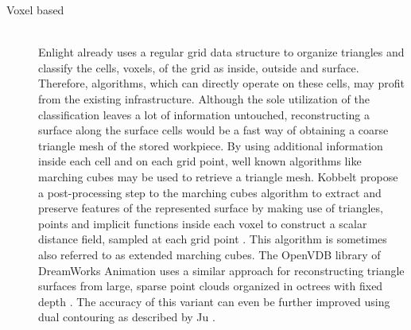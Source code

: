 \begin{description}
	\item[Voxel based] \hfill \\
	Enlight already uses a regular grid data structure to organize triangles and classify the cells, \ie voxels, of the grid as inside, outside and surface.
	Therefore, algorithms, which can directly operate on these cells, may profit from the existing infrastructure.
	Although the sole utilization of the classification leaves a lot of information untouched, reconstructing a surface along the surface cells would be a fast way of obtaining a coarse triangle mesh of the stored workpiece.
	By using additional information inside each cell and on each grid point, well known algorithms like marching cubes may be used to retrieve a triangle mesh.
	Kobbelt \etal propose a post-processing step to the marching cubes algorithm to extract and preserve features of the represented surface by making use of triangles, points and implicit functions inside each voxel to construct a scalar distance field, sampled at each grid point \cite{extended_marching_cubes}.
	This algorithm is sometimes also referred to as extended marching cubes.
	The OpenVDB library of DreamWorks Animation uses a similar approach for reconstructing triangle surfaces from large, sparse point clouds organized in octrees with fixed depth \cite{openvdb}.
	The accuracy of this variant can even be further improved using dual contouring as described by Ju \etal \cite{dual_contouring}.
\end{description}
